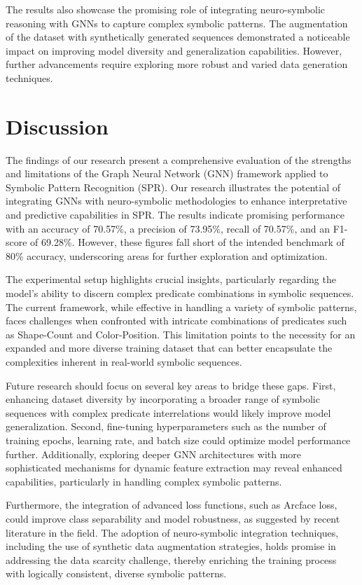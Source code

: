 \documentclass{article}
\begin{document}
The results also showcase the promising role of integrating neuro-symbolic reasoning with GNNs to capture complex symbolic patterns. The augmentation of the dataset with synthetically generated sequences demonstrated a noticeable impact on improving model diversity and generalization capabilities. However, further advancements require exploring more robust and varied data generation techniques.

\section{Discussion}
The findings of our research present a comprehensive evaluation of the strengths and limitations of the Graph Neural Network (GNN) framework applied to Symbolic Pattern Recognition (SPR). Our research illustrates the potential of integrating GNNs with neuro-symbolic methodologies to enhance interpretative and predictive capabilities in SPR. The results indicate promising performance with an accuracy of 70.57\%, a precision of 73.95\%, recall of 70.57\%, and an F1-score of 69.28\%. However, these figures fall short of the intended benchmark of 80\% accuracy, underscoring areas for further exploration and optimization.

The experimental setup highlights crucial insights, particularly regarding the model's ability to discern complex predicate combinations in symbolic sequences. The current framework, while effective in handling a variety of symbolic patterns, faces challenges when confronted with intricate combinations of predicates such as Shape-Count and Color-Position. This limitation points to the necessity for an expanded and more diverse training dataset that can better encapsulate the complexities inherent in real-world symbolic sequences.

Future research should focus on several key areas to bridge these gaps. First, enhancing dataset diversity by incorporating a broader range of symbolic sequences with complex predicate interrelations would likely improve model generalization. Second, fine-tuning hyperparameters such as the number of training epochs, learning rate, and batch size could optimize model performance further. Additionally, exploring deeper GNN architectures with more sophisticated mechanisms for dynamic feature extraction may reveal enhanced capabilities, particularly in handling complex symbolic patterns.

Furthermore, the integration of advanced loss functions, such as Arcface loss, could improve class separability and model robustness, as suggested by recent literature in the field. The adoption of neuro-symbolic integration techniques, including the use of synthetic data augmentation strategies, holds promise in addressing the data scarcity challenge, thereby enriching the training process with logically consistent, diverse symbolic patterns.
\end{document}
